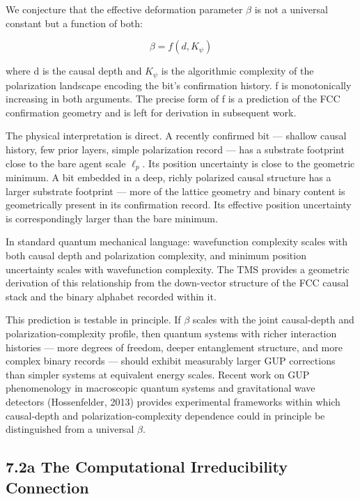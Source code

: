 \documentclass[11pt,oneside]{report}
\theoremstyle{definition}
\theoremstyle{remark}
\begin{document}
We conjecture that the effective deformation parameter \ensuremath{\beta} is not a
universal constant but a function of both:

\begin{equation*}
\beta = f(d, K_{\psi})
\end{equation*}

where d is the causal depth and \ensuremath{K_{\psi}} is the algorithmic complexity of
the polarization landscape encoding the bit's confirmation history. f is
monotonically increasing in both arguments. The precise form of f is a
prediction of the FCC confirmation geometry and is left for derivation
in subsequent work.

The physical interpretation is direct. A recently confirmed bit ---
shallow causal history, few prior layers, simple polarization record ---
has a substrate footprint close to the bare agent scale \ensuremath{\ell_{p}.} Its position
uncertainty is close to the geometric minimum. A bit embedded in a deep,
richly polarized causal structure has a larger substrate footprint ---
more of the lattice geometry and binary content is geometrically present
in its confirmation record. Its effective position uncertainty is
correspondingly larger than the bare minimum.

In standard quantum mechanical language: wavefunction complexity scales
with both causal depth and polarization complexity, and minimum position
uncertainty scales with wavefunction complexity. The TMS provides a
geometric derivation of this relationship from the down-vector structure
of the FCC causal stack and the binary alphabet recorded within it.

This prediction is testable in principle. If \ensuremath{\beta} scales with the joint
causal-depth and polarization-complexity profile, then quantum systems
with richer interaction histories --- more degrees of freedom, deeper
entanglement structure, and more complex binary records --- should
exhibit measurably larger GUP corrections than simpler systems at
equivalent energy scales. Recent work on GUP phenomenology in
macroscopic quantum systems and gravitational wave detectors
(Hossenfelder, 2013) provides experimental frameworks within which
causal-depth and polarization-complexity dependence could in principle
be distinguished from a universal \ensuremath{\beta .}

\subsection*{7.2a The Computational Irreducibility Connection}
\end{document}
